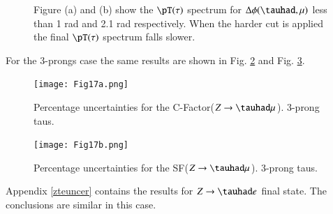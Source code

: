 \begin{figure}[htbp]
	\centering
	\caption{Figure (a) and (b) show the  $\pT(\tau)$ spectrum for  $\Delta\phi(\tauhad ,\mu)$ less than 1 rad and 2.1 rad respectively. When the harder cut is applied the final $\pT(\tau)$ spectrum falls slower.}
	\label{Fig18}
\end{figure}

For the 3-prongs case the same results are shown in Fig. \ref{Fig17a} and Fig. \ref{Fig17b}.

\begin{figure}[htbp]
	\centering
	\texttt{[image: Fig17a.png]}
	\caption{Percentage uncertainties for the C-Factor($Z\to\tauhad\mu$). 3-prong taus.}
	\label{Fig17a}
\end{figure}
\begin{figure}[htbp]
	\centering
	\texttt{[image: Fig17b.png]}
	\caption{Percentage uncertainties for the SF($Z\to\tauhad\mu$). 3-prong taus.}
	\label{Fig17b}
\end{figure}

Appendix \ref{zteuncer} contains the results for $Z\to\tauhad e$ final state. The conclusions are similar in this case.

